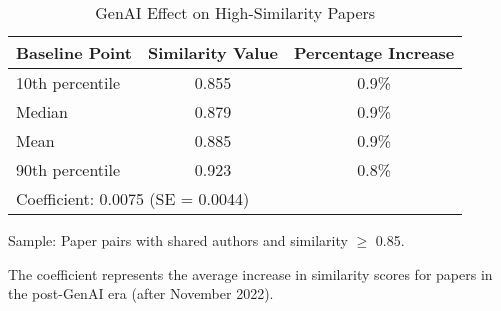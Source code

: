 \begin{table}[htbp]
\centering
\caption{GenAI Effect on High-Similarity Papers}
\begin{tabular}{lcc}
\toprule
Baseline Point & Similarity Value & Percentage Increase \\
\midrule
10th percentile & 0.855 &  0.9\% \\
Median & 0.879 &  0.9\% \\
Mean & 0.885 &  0.9\% \\
90th percentile & 0.923 &  0.8\% \\
\midrule
\multicolumn{3}{l}{Coefficient: 0.0075 (SE = 0.0044)} \\
\bottomrule
\end{tabular}
\begin{tablenotes}
\small
\item Sample: Paper pairs with shared authors and similarity $\geq$ 0.85.
\item The coefficient represents the average increase in similarity scores
for papers in the post-GenAI era (after November 2022).
\end{tablenotes}
\end{table}
